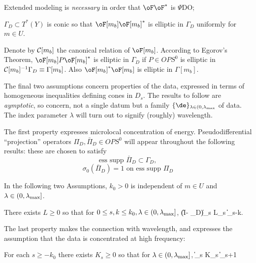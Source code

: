  Extended modeling is {\em necessary} in order that $\oF\oF^*$ is $\Psi$DO;

  $\Gamma_D \subset T^*(Y)$ is conic so that $\oF[m_b]\oF[m_b]^*$ is elliptic in $\Gamma_D$ uniformly for $m \in U$.

 Denote by ${\cal C}[m_b]$ the canonical relation of $\oF[m_b]$. According to Egorov's Theorem, $\oF[m_b] P \oF[m_b]^*$ is elliptic in $\Gamma_D$ if $P \in OPS^0$ is elliptic in ${\cal C}[m_b]^{-1}\Gamma_D \equiv \Gamma[m_b]$. Also $\oF[m_b]^*\oF[m_b]$ is elliptic in $\Gamma[m_b]$.

The final two assumptions concern properties of the data, expressed in
terms of homogeneous inequalities defining cones in $D_s$. The results
to follow are {\em aymptotic}, so concern, not a single datum but a family
$\{\de\}_{\lambda \in (0,\lambda_{\rm max}}$ of data. The index
parameter $\lambda$ will turn out to signify (roughly) wavelength. 

The first property expresses microlocal concentration of energy.
Pseudodifferential ``projection'' operators $\Pi_D, \bar{\Pi}_D \in
OPS^0$ will appear throughout the following results: these are chosen
to satisfy 
\[
\mbox{ess supp } \bar{\Pi}_D \subset \Gamma_D,
\]
\[
\sigma_0(\bar{\Pi}_D) = 1 \mbox{ on ess supp } \Pi_D
\]

In the following two Assumptions, $k_0>0$ is 
independent of $m \in U$ and $\lambda \in (0,\lambda_{\rm max}]$. 

 There exists $L
\ge 0$ so that for $0 \le s,  k \le k_0, \lambda \in
(0, \lambda_{\rm max}]$,
\be
\label{micro}
\|(I- \Pi_D)\de\|_s \le L_s \|\de\|_{s-k}.
\ee

The last property makes the connection with wavelength, and expresses
the assumption that the data is concentrated at high frequency:

For each $s \ge -k_0$ there exists $K_s
\ge 0$ so that for  $\lambda \in
(0, \lambda_{\rm max}]$,
\be
\label{hfcd}
\|\de\|_{s} \le K_s \lambda\|\de\|_{s+1}
\ee

